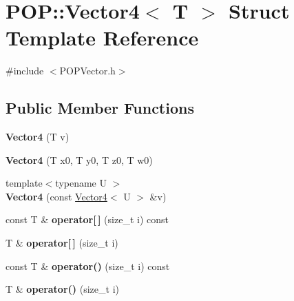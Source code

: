 \hypertarget{struct_p_o_p_1_1_vector4}{}\section{P\+OP\+:\+:Vector4$<$ T $>$ Struct Template Reference}
\label{struct_p_o_p_1_1_vector4}


{\ttfamily \#include $<$P\+O\+P\+Vector.\+h$>$}

\subsection*{Public Member Functions}
\begin{DoxyCompactItemize}
\item 
\mbox{\label{struct_p_o_p_1_1_vector4_a83ee4127d8094e58dc6117034d4c85f9}} 
{\bfseries Vector4} (T v)
\item 
\mbox{\label{struct_p_o_p_1_1_vector4_a40bd7f38483daa238c1dec7861b7ecef}} 
{\bfseries Vector4} (T x0, T y0, T z0, T w0)
\item 
\mbox{\label{struct_p_o_p_1_1_vector4_a22469e468081fc0b9b8575ebd41e2915}} 
{\footnotesize template$<$typename U $>$ }\\{\bfseries Vector4} (const \mbox{\hyperlink{struct_p_o_p_1_1_vector4}{Vector4}}$<$ U $>$ \&v)
\item 
\mbox{\label{struct_p_o_p_1_1_vector4_a02197fa04dedd5ef0d0b79ef7bad86ab}} 
const T \& {\bfseries operator\mbox{[}$\,$\mbox{]}} (size\+\_\+t i) const
\item 
\mbox{\label{struct_p_o_p_1_1_vector4_a72c2dce062bf64a52fbe94aae638fcfd}} 
T \& {\bfseries operator\mbox{[}$\,$\mbox{]}} (size\+\_\+t i)
\item 
\mbox{\label{struct_p_o_p_1_1_vector4_a2adf08d9418eab889007421eed2d4fa9}} 
const T \& {\bfseries operator()} (size\+\_\+t i) const
\item 
\mbox{\label{struct_p_o_p_1_1_vector4_afe198076194d8a5b14f8033d40959ff1}} 
T \& {\bfseries operator()} (size\+\_\+t i)

\end{DoxyCompactItemize}
